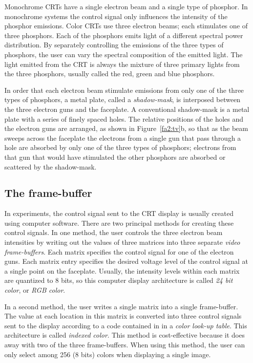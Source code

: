 Monochrome CRTs have a single electron beam and a single type of
phosphor. In monochrome systems the control signal only influences the
intensity of the phosphor emissions.  Color CRTs use three electron
beams; each stimulates one of three phosphors.  Each of the phosphors
emits light of a different spectral power distribution.  By separately
controlling the emissions of the three types of phosphors, the user
can vary the spectral composition of the emitted light.  The
light emitted from the CRT is always the mixture of three primary
lights from the three phosphors, usually called the red, green and
blue phosphors.

In order that each electron beam stimulate emissions from only one of
the three types of phosphors, a metal plate, called a {\em
shadow-mask}, is interposed between the three electron guns and the
faceplate.  A conventional shadow-mask is a metal plate with a series
of finely spaced holes.  The relative positions of the holes and the
electron guns are arranged, as shown in Figure~\ref{fa2:tv}b, so that
as the beam sweeps across the faceplate the electrons from a single
gun that pass through a hole are absorbed by only one of the three
types of phosphors; electrons from that gun that would have stimulated
the other phosphors are absorbed or scattered by the shadow-mask.

\subsection*{The frame-buffer}
In experiments, the control signal sent to the CRT display is usually
created using computer software.  There are two principal methods for
creating these control signals.  In one method, the user controls the
three electron beam intensities by writing out the values of three
matrices into three separate {\em video frame-buffers}.  Each matrix
specifies the control signal for one of the electron guns.  Each
matrix entry specifies the desired voltage level of the control signal
at a single point on the faceplate.  Usually, the intensity levels
within each matrix are quantized to 8 bits, so this computer display
architecture is called {\em 24 bit color}, or {\em RGB color}.

In a second method, the user writes a single matrix into a single
frame-buffer.  The value at each location in this matrix is converted
into three control signals sent to the display according to a code
contained in in a {\em color look-up table}.  This architecture is
called {\em indexed color}.  This method is cost-effective because it
does away with two of the three frame-buffers.  When using this
method, the user can only select among 256 (8 bits) colors when displaying
a single image.

